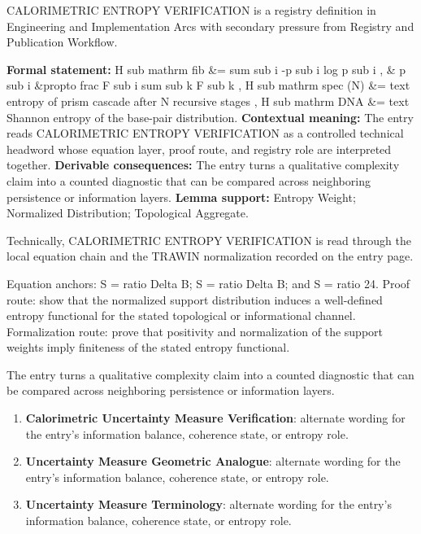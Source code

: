 
\begingroup\small
{}
CALORIMETRIC ENTROPY VERIFICATION is a registry definition in Engineering and Implementation Arcs with secondary pressure from Registry and Publication Workflow.

\begingroup\footnotesize\setlength{\emergencystretch}{3em}\sloppy
\textbf{Formal statement:} H sub mathrm fib \&= sum sub i -p sub i log p sub i , \& p sub i \&propto frac F sub i sum sub k F sub k , H sub mathrm spec (N) \&= text entropy of prism cascade after N recursive stages , H sub mathrm DNA \&= text Shannon entropy of the base-pair distribution. \textbf{Contextual meaning:} The entry reads CALORIMETRIC ENTROPY VERIFICATION as a controlled technical headword whose equation layer, proof route, and registry role are interpreted together. \textbf{Derivable consequences:} The entry turns a qualitative complexity claim into a counted diagnostic that can be compared across neighboring persistence or information layers. \textbf{Lemma support:} Entropy Weight; Normalized Distribution; Topological Aggregate.\par
\endgroup

Technically, CALORIMETRIC ENTROPY VERIFICATION is read through the local equation chain and the TRAWIN normalization recorded on the entry page.

Equation anchors: S = ratio Delta B; S = ratio Delta B; and S = ratio 24. Proof route: show that the normalized support distribution induces a well-defined entropy functional for the stated topological or informational channel. Formalization route: prove that positivity and normalization of the support weights imply finiteness of the stated entropy functional.

The entry turns a qualitative complexity claim into a counted diagnostic that can be compared across neighboring persistence or information layers.
\endgroup

\begin{enumerate}[leftmargin=1.6em,itemsep=6pt,topsep=4pt]
\item \textbf{Calorimetric Uncertainty Measure Verification}: alternate wording for the entry's information balance, coherence state, or entropy role.
\item \textbf{Uncertainty Measure Geometric Analogue}: alternate wording for the entry's information balance, coherence state, or entropy role.
\item \textbf{Uncertainty Measure Terminology}: alternate wording for the entry's information balance, coherence state, or entropy role.
\end{enumerate}

